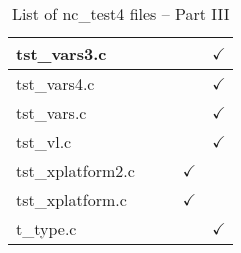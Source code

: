 \begin{table}[H]
\begin{tabular}{|l|c|c|c|c|}
tst\_vars3.c   &  &   &   & $\checkmark$    \\ \hline
tst\_vars4.c   &  &   &   & $\checkmark$    \\ \hline
tst\_vars.c   &  &   &   & $\checkmark$    \\ \hline
tst\_vl.c   &  &   &   & $\checkmark$    \\ \hline
tst\_xplatform2.c   &  &   &  $\checkmark$ &    \\ \hline
tst\_xplatform.c   &  &   &  $\checkmark$ &    \\ \hline
t\_type.c   &  &   &   & $\checkmark$    \\ \hline
\hline
\end{tabular}
\caption{\label{tab:nc_test4_3} List of nc\_test4 files -- Part III}
\end{table}
